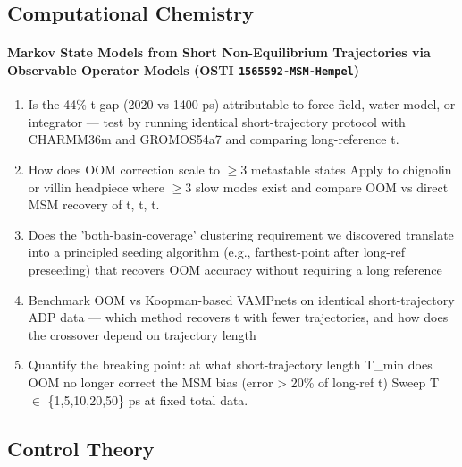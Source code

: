 \documentclass[11pt]{article}
\begin{document}
\subsection*{Computational Chemistry}
\paragraph{Markov State Models from Short Non-Equilibrium Trajectories via Observable Operator Models \textnormal{\small(OSTI \texttt{1565592-MSM-Hempel})}}
\begin{enumerate}[leftmargin=1.6em,itemsep=0.2em,topsep=0.2em,label=Q\arabic*.]
\item Is the 44\% t gap (2020 vs 1400 ps) attributable to force field, water model, or integrator --- test by running identical short-trajectory protocol with CHARMM36m and GROMOS54a7 and comparing long-reference t.
\item How does OOM correction scale to $\geq$3 metastable states Apply to chignolin or villin headpiece where $\geq$3 slow modes exist and compare OOM vs direct MSM recovery of t, t, t.
\item Does the 'both-basin-coverage' clustering requirement we discovered translate into a principled seeding algorithm (e.g., farthest-point after long-ref preseeding) that recovers OOM accuracy without requiring a long reference
\item Benchmark OOM vs Koopman-based VAMPnets on identical short-trajectory ADP data --- which method recovers t with fewer trajectories, and how does the crossover depend on trajectory length
\item Quantify the breaking point: at what short-trajectory length T\_min does OOM no longer correct the MSM bias (error \textgreater{} 20\% of long-ref t) Sweep T $\in$ \{1,5,10,20,50\} ps at fixed total data.
\end{enumerate}
\subsection*{Control Theory}
\end{document}
